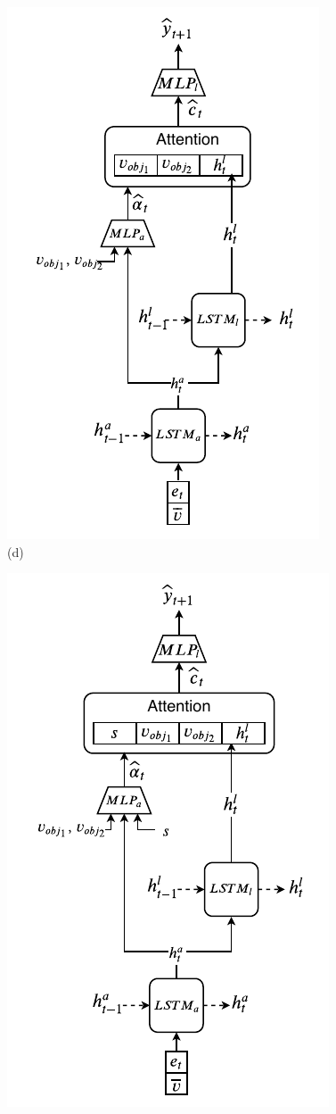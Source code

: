 \begin{figure}[th]
\begin{minipage}{.20\textwidth}
		\includegraphics[scale=0.43]{studies/inlg2019/figures/top-down.pdf} \\
		(d)
	\end{minipage}%
	\begin{minipage}{.20\textwidth}
		\centering
		\includegraphics[scale=0.43]{studies/inlg2019/figures/top-down+s.pdf} \\

\end{minipage}
\end{figure}
